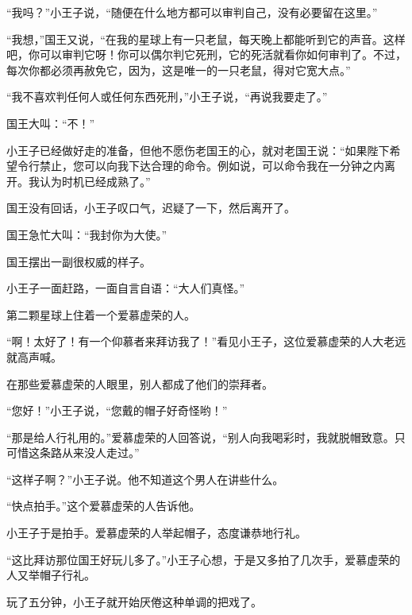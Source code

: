 “我吗？”小王子说，“随便在什么地方都可以审判自己，没有必要留在这里。”

“我想，”国王又说，“在我的星球上有一只老鼠，每天晚上都能听到它的声音。这样吧，你可以审判它呀！你可以偶尔判它死刑，它的死活就看你如何审判了。不过，每次你都必须再赦免它，因为，这是唯一的一只老鼠，得对它宽大点。”

“我不喜欢判任何人或任何东西死刑，”小王子说，“再说我要走了。”

国王大叫：“不！”

小王子已经做好走的准备，但他不愿伤老国王的心，就对老国王说：“如果陛下希望令行禁止，您可以向我下达合理的命令。例如说，可以命令我在一分钟之内离开。我认为时机已经成熟了。”

国王没有回话，小王子叹口气，迟疑了一下，然后离开了。

国王急忙大叫：“我封你为大使。”

国王摆出一副很权威的样子。

小王子一面赶路，一面自言自语：“大人们真怪。”

{\startalignment[center]
 \stopalignment}


\stoptitle

\starttitle[title={11}]

第二颗星球上住着一个爱慕虚荣的人。

“啊！太好了！有一个仰慕者来拜访我了！”看见小王子，这位爱慕虚荣的人大老远就高声喊。

在那些爱慕虚荣的人眼里，别人都成了他们的崇拜者。

“您好！”小王子说，“您戴的帽子好奇怪哟！”

“那是给人行礼用的。”爱慕虚荣的人回答说，“别人向我喝彩时，我就脱帽致意。只可惜这条路从来没人走过。”

“这样子啊？”小王子说。他不知道这个男人在讲些什么。

“快点拍手。”这个爱慕虚荣的人告诉他。

小王子于是拍手。爱慕虚荣的人举起帽子，态度谦恭地行礼。

“这比拜访那位国王好玩儿多了。”小王子心想，于是又多拍了几次手，爱慕虚荣的人又举帽子行礼。

{\startalignment[center]
 \stopalignment}

玩了五分钟，小王子就开始厌倦这种单调的把戏了。

